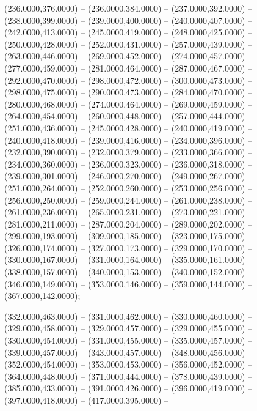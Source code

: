 \begin{scope}[shift={(-231.87,-121.87)}]
\begin{scope}[draw=black,fill=cabdda4,line join=round,line width=0.208pt]
        (236.0000,376.0000) -- (236.0000,384.0000) -- (237.0000,392.0000) --
        (238.0000,399.0000) -- (239.0000,400.0000) -- (240.0000,407.0000) --
        (242.0000,413.0000) -- (245.0000,419.0000) -- (248.0000,425.0000) --
        (250.0000,428.0000) -- (252.0000,431.0000) -- (257.0000,439.0000) --
        (263.0000,446.0000) -- (269.0000,452.0000) -- (274.0000,457.0000) --
        (277.0000,459.0000) -- (281.0000,464.0000) -- (287.0000,467.0000) --
        (292.0000,470.0000) -- (298.0000,472.0000) -- (300.0000,473.0000) --
        (298.0000,475.0000) -- (290.0000,473.0000) -- (284.0000,470.0000) --
        (280.0000,468.0000) -- (274.0000,464.0000) -- (269.0000,459.0000) --
        (264.0000,454.0000) -- (260.0000,448.0000) -- (257.0000,444.0000) --
        (251.0000,436.0000) -- (245.0000,428.0000) -- (240.0000,419.0000) --
        (240.0000,418.0000) -- (239.0000,416.0000) -- (234.0000,396.0000) --
        (232.0000,390.0000) -- (232.0000,379.0000) -- (233.0000,366.0000) --
        (234.0000,360.0000) -- (236.0000,323.0000) -- (236.0000,318.0000) --
        (239.0000,301.0000) -- (246.0000,270.0000) -- (249.0000,267.0000) --
        (251.0000,264.0000) -- (252.0000,260.0000) -- (253.0000,256.0000) --
        (256.0000,250.0000) -- (259.0000,244.0000) -- (261.0000,238.0000) --
        (261.0000,236.0000) -- (265.0000,231.0000) -- (273.0000,221.0000) --
        (281.0000,211.0000) -- (287.0000,204.0000) -- (289.0000,202.0000) --
        (299.0000,193.0000) -- (309.0000,185.0000) -- (323.0000,175.0000) --
        (326.0000,174.0000) -- (327.0000,173.0000) -- (329.0000,170.0000) --
        (330.0000,167.0000) -- (331.0000,164.0000) -- (335.0000,161.0000) --
        (338.0000,157.0000) -- (340.0000,153.0000) -- (340.0000,152.0000) --
        (346.0000,149.0000) -- (353.0000,146.0000) -- (359.0000,144.0000) --
        (367.0000,142.0000);
  \end{scope}
  \begin{scope}[draw=black,fill=c2b83ba,line join=round,line width=0.208pt]
       (332.0000,463.0000) -- (331.0000,462.0000) --
        (330.0000,460.0000) -- (329.0000,458.0000) -- (329.0000,457.0000) --
        (329.0000,455.0000) -- (330.0000,454.0000) -- (331.0000,455.0000) --
        (335.0000,457.0000) -- (339.0000,457.0000) -- (343.0000,457.0000) --
        (348.0000,456.0000) -- (352.0000,454.0000) -- (353.0000,453.0000) --
        (356.0000,452.0000) -- (364.0000,448.0000) -- (371.0000,444.0000) --
        (378.0000,439.0000) -- (385.0000,433.0000) -- (391.0000,426.0000) --
        (396.0000,419.0000) -- (397.0000,418.0000) -- (417.0000,395.0000) --

\end{scope}
\end{scope}
